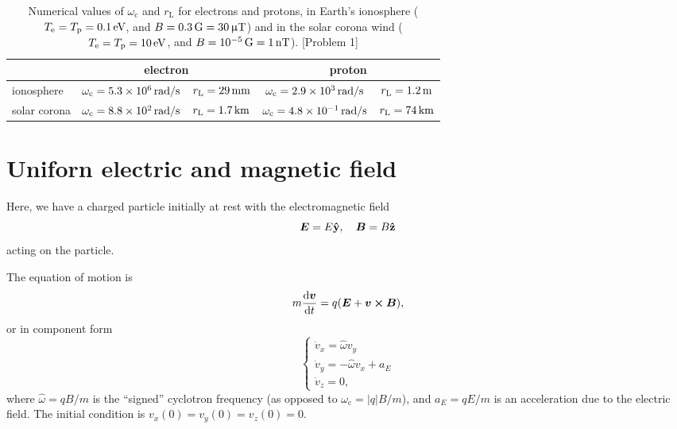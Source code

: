 \documentclass[11pt,a4paper, 
swedish, english %
]{article}
\newcommand{\wc}{\ensuremath{\omega_{\text{c}}}}
\newcommand{\rL}{\ensuremath{r_{\text{L}}}}
\begin{document}
\begin{table}
\begin{center}
\caption{Numerical values of $\wc$ and $\rL$ for electrons and
  protons, in Earth's ionosphere ($T_\ee=T_\text{p}=\unit[0.1]{eV}$,
  and $B=\unit[0.3]{G}=\unit[30]{\micro T}$) and in the solar corona
  wind ($T_\ee=T_\text{p}=\unit[10]{eV}$, and
  $B=\unit[10^{-5}]{G}=\unit[1]{nT}$). [Problem 1]
}\label{tab1}
\begin{tabular}{|l|c|c|c|c|}\cline{2-5}
\multicolumn{1}{c|}{}
&\multicolumn{2}{|c|}{electron} 
&\multicolumn{2}{|c|}{proton} \\ \hline
ionosphere 
&$\wc=\unit[5.3\times10^{6}]{rad/s}$ & $\rL=\unit[29]{mm}$
&$\wc=\unit[2.9\times10^{3}]{rad/s}$ & $\rL=\unit[1.2]{m}$
\\ \hline
solar corona 
&$\wc=\unit[8.8\times10^{2}]{rad/s}$ & $\rL=\unit[1.7]{km}$
&$\wc=\unit[4.8\times10^{-1}]{rad/s}$ & $\rL=\unit[74]{km}$
\\ \hline
\end{tabular}
\end{center}
\end{table}

\section{Uniforn electric and magnetic field}
Here, we have a charged particle initially at rest with the
electromagnetic field
\begin{equation}
\vb*E = E\vu{y}\qc
\vb*B = B\vu{z}
\end{equation}
acting on the particle.

The equation of motion is
\begin{equation}
m\dv{\vb*v}{t} = q\qty(\vb*E + \vb*v\cross\vb*B),
\end{equation}
or in component form
\begin{equation}\label{eq2:ODEs}
\begin{cases}
\dot{v}_x = \hat\omega v_y\\
\dot{v}_y = -\hat\omega v_x + a_E\\
\dot{v}_z = 0,
\end{cases}
\end{equation}
where $\hat\omega = qB/m$ is the ``signed'' cyclotron frequency 
(as opposed to $\wc=|q|B/m$), and $a_E=qE/m$ is an
acceleration due to the electric field. The initial condition is 
$v_x(0)=v_y(0)=v_z(0)=0$.
\end{document}
